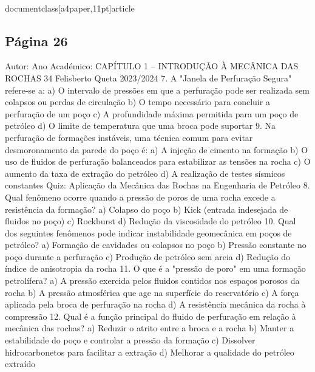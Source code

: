 \\documentclass[a4paper,11pt]{article}
\begin{document}
\subsection*{Página 26}
Autor:
Ano Académico:
CAPÍTULO 1 – INTRODUÇÃO À MECÂNICA DAS ROCHAS
34
Felisberto Queta
2023/2024
7. A "Janela de Perfuração Segura" refere-se a:
a) O intervalo de pressões em que a perfuração pode ser realizada sem colapsos ou perdas de circulação
b) O tempo necessário para concluir a perfuração de um poço
c) A profundidade máxima permitida para um poço de petróleo
d) O limite de temperatura que uma broca pode suportar
9. Na perfuração de formações instáveis, uma técnica comum para evitar desmoronamento da parede do poço é:
a) A injeção de cimento na formação
b) O uso de fluidos de perfuração balanceados para estabilizar as tensões na rocha
c) O aumento da taxa de extração do petróleo
d) A realização de testes sísmicos constantes
Quiz: Aplicação da 
Mecânica das 
Rochas na 
Engenharia de 
Petróleo
8. Qual fenômeno ocorre quando a pressão de poros de uma rocha excede a resistência da formação?
a) Colapso do poço
b) Kick (entrada indesejada de fluidos no poço)
c) Rockburst
d) Redução da viscosidade do petróleo
10. Qual dos seguintes fenômenos pode indicar instabilidade geomecânica em poços de petróleo?
a) Formação de cavidades ou colapsos no poço
b) Pressão constante no poço durante a perfuração
c) Produção de petróleo sem areia
d) Redução do índice de anisotropia da rocha
11. O que é a "pressão de poro" em uma formação petrolífera?
a) A pressão exercida pelos fluidos contidos nos espaços porosos da rocha
b) A pressão atmosférica que age na superfície do reservatório
c) A força aplicada pela broca de perfuração na rocha
d) A resistência mecânica da rocha à compressão
12. Qual é a função principal do fluido de perfuração em relação à mecânica das rochas?
a) Reduzir o atrito entre a broca e a rocha
b) Manter a estabilidade do poço e controlar a pressão da formação
c) Dissolver hidrocarbonetos para facilitar a extração
d) Melhorar a qualidade do petróleo extraído
\end{document}
